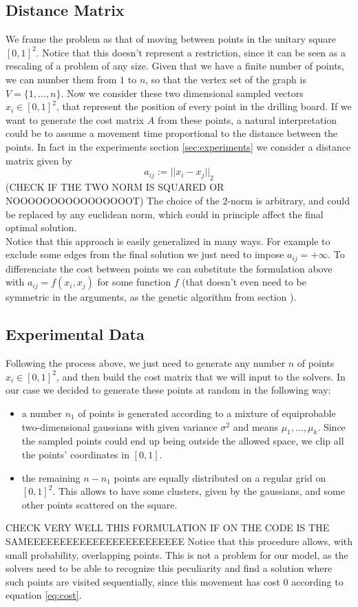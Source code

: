 \documentclass{article}
\begin{document}
\subsection*{Distance Matrix}
We frame the problem as that of moving between points in the unitary square $[0, 1]^2$. Notice that this doesn't represent a restriction, since it can be seen as a rescaling of a problem of any size. Given that we have a finite number of points, we can number them from $1$ to $n$, so that the vertex set of the graph is $V = \{ 1, \ldots, n  \}$. Now we consider these two dimensional sampled vectors $x_i \in [0, 1]^2 $, that represent the position of every point in the drilling board. If we want to generate the cost matrix $A$ from these points, a natural interpretation could be to assume a movement time proportional to the distance between the points. In fact in the experiments section \ref{sec:experiments} we consider a distance matrix given by
\begin{equation}\label{eq:cost}
a_{ij} := {|| x_i - x_j ||}_2
\end{equation} 
(CHECK IF THE TWO NORM IS SQUARED OR NOOOOOOOOOOOOOOOOT) The choice of the 2-norm is arbitrary, and could be replaced by any euclidean norm, which could in principle affect the final optimal solution. \\
Notice that this approach is easily generalized in many ways. For example to exclude some edges from the final solution we just need to impose $a_{ij} = +\infty$. To differenciate the cost between points we can substitute the formulation above with $a_{ij} = f(x_i, x_j)$ for some function $f$ (that doesn't even need to be symmetric in the arguments, as the genetic algorithm from section ).  

\subsection*{Experimental Data}
Following the process above, we just need to generate any number $n$ of points $x_i \in [0, 1]^2 $, and then build the cost matrix that we will input to the solvers. In our case we decided to generate these points at random in the following way:
\begin{itemize}
\item a number $n_1$ of points is generated according to a mixture of equiprobable two-dimensional gaussians with given variance $\sigma^2$ and means $\mu_1, \ldots, \mu_k$. Since the sampled points could end up being outside the allowed space, we clip all the points' coordinates in $[0, 1]$. 
\item the remaining $n-n_1$ points are equally distributed on a regular grid on  $[0, 1]^2$. This allows to have some clusters, given by the gaussians, and some other points scattered on the square. 
\end{itemize}
CHECK VERY WELL THIS FORMULATION IF ON THE CODE IS THE SAMEEEEEEEEEEEEEEEEEEEEEEEE
Notice that this procedure allows, with small probability, overlapping points. This is not a problem for our model, as the solvers need to be able to recognize this peculiarity and find a solution where such points are visited sequentially, since this movement has cost 0 according to equation \eqref{eq:cost}.
\end{document}
